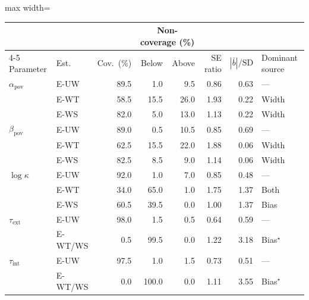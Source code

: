 \small
\begin{adjustbox}{max width=\textwidth}
\begin{tabular}{@{}l l r rr r r l@{}}
\toprule
 & & & \multicolumn{2}{c}{Non-coverage (\%)} & & \\
\cmidrule(lr){4-5}
Parameter & Est. & Cov.\ (\%) & Below & Above &
  SE ratio & $|\bar{b}|/\text{SD}$ & Dominant source \\
\midrule
$\alpha_{\text{pov}}$ & E-UW & 89.5 & 1.0 & 9.5 & 0.86 & 0.63 & ---  \\
 & E-WT & 58.5 & 15.5 & 26.0 & 1.93 & 0.22 & Width \\
 & E-WS & 82.0 & 5.0 & 13.0 & 1.13 & 0.22 & Width \\[3pt]
$\beta_{\text{pov}}$ & E-UW & 89.0 & 0.5 & 10.5 & 0.85 & 0.69 & --- \\
 & E-WT & 62.5 & 15.5 & 22.0 & 1.88 & 0.06 & Width \\
 & E-WS & 82.5 & 8.5 & 9.0 & 1.14 & 0.06 & Width \\[3pt]
$\log\kappa$ & E-UW & 92.0 & 1.0 & 7.0 & 0.85 & 0.48 & --- \\
 & E-WT & 34.0 & 65.0 & 1.0 & 1.75 & 1.37 & Both \\
 & E-WS & 60.5 & 39.5 & 0.0 & 1.00 & 1.37 & Bias \\[3pt]
$\tau_{\text{ext}}$ & E-UW & 98.0 & 1.5 & 0.5 & 0.64 & 0.59 & --- \\
 & E-WT/WS & 0.5 & 99.5 & 0.0 & 1.22 & 3.18 & Bias$^{\star}$ \\[3pt]
$\tau_{\text{int}}$ & E-UW & 97.5 & 1.0 & 1.5 & 0.73 & 0.51 & --- \\
 & E-WT/WS & 0.0 & 100.0 & 0.0 & 1.11 & 3.55 & Bias$^{\star}$ \\
\bottomrule
\end{tabular}
\end{adjustbox}
